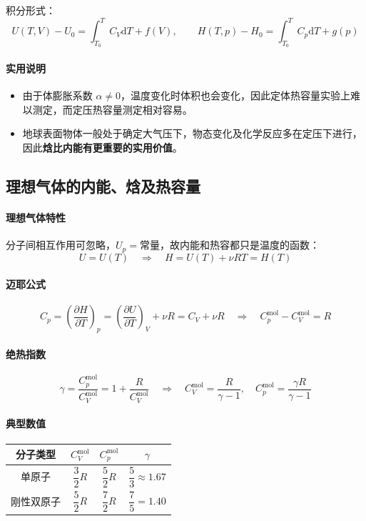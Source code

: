 \documentclass[UTF8]{ctexart}
\begin{document}
积分形式：
\[
U(T,V)-U_0=\int_{T_0}^T C_V\mathrm{d}T+f(V),\qquad
H(T,p)-H_0=\int_{T_0}^T C_p\mathrm{d}T+g(p)
\]

\paragraph{实用说明}
\begin{itemize}[leftmargin=2em]
  \item 由于体膨胀系数 $\alpha\neq 0$，温度变化时体积也会变化，因此定体热容量实验上难以测定，而定压热容量测定相对容易。
  \item 地球表面物体一般处于确定大气压下，物态变化及化学反应多在定压下进行，因此\textbf{焓比内能有更重要的实用价值}。
\end{itemize}

\subsection{理想气体的内能、焓及热容量}

\paragraph{理想气体特性}
分子间相互作用可忽略，$U_p=\text{常量}$，故内能和热容都只是温度的函数：
\[
U=U(T)\quad\Longrightarrow\quad H=U(T)+\nu RT=H(T)
\]

\paragraph{迈耶公式}
\[
C_p=\left(\frac{\partial H}{\partial T}\right)_p=\left(\frac{\partial U}{\partial T}\right)_V+\nu R
=C_V+\nu R
\quad\Longrightarrow\quad
\boxed{C_p^{\mathrm{mol}}-C_V^{\mathrm{mol}}=R}
\]

\paragraph{绝热指数}
\[
\boxed{\gamma=\frac{C_p^{\mathrm{mol}}}{C_V^{\mathrm{mol}}}=1+\frac{R}{C_V^{\mathrm{mol}}}}
\quad\Longrightarrow\quad
C_V^{\mathrm{mol}}=\frac{R}{\gamma-1},\quad
C_p^{\mathrm{mol}}=\frac{\gamma R}{\gamma-1}
\]

\paragraph{典型数值}
\begin{center}
\begin{tabular}{c|c|c|c}
\hline
分子类型 & $C_V^{\mathrm{mol}}$ & $C_p^{\mathrm{mol}}$ & $\gamma$ \\
\hline
单原子 & $\dfrac{3}{2}R$ & $\dfrac{5}{2}R$ & $\dfrac{5}{3}\approx 1.67$ \\
刚性双原子 & $\dfrac{5}{2}R$ & $\dfrac{7}{2}R$ & $\dfrac{7}{5}=1.40$ \\
\hline
\end{tabular}
\end{center}
\end{document}
